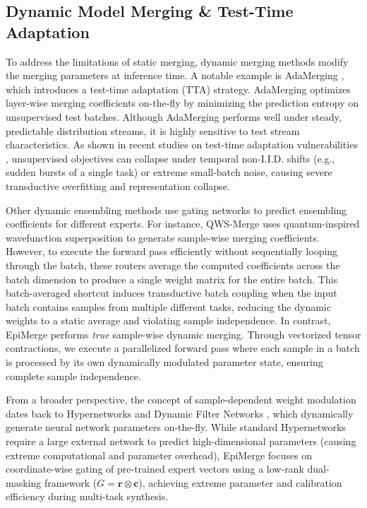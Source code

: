 \subsection{Dynamic Model Merging \& Test-Time Adaptation}
To address the limitations of static merging, dynamic merging methods modify the merging parameters at inference time. A notable example is AdaMerging \cite{adamerging}, which introduces a test-time adaptation (TTA) strategy. AdaMerging optimizes layer-wise merging coefficients on-the-fly by minimizing the prediction entropy on unsupervised test batches. Although AdaMerging performs well under steady, predictable distribution streams, it is highly sensitive to test stream characteristics. As shown in recent studies on test-time adaptation vulnerabilities \cite{wang2020tent, tta_rugged, tta_shift}, unsupervised objectives can collapse under temporal non-I.I.D. shifts (e.g., sudden bursts of a single task) or extreme small-batch noise, causing severe transductive overfitting and representation collapse.

Other dynamic ensembling methods use gating networks to predict ensembling coefficients for different experts. For instance, QWS-Merge \cite{qws_merge} uses quantum-inspired wavefunction superposition to generate sample-wise merging coefficients. However, to execute the forward pass efficiently without sequentially looping through the batch, these routers average the computed coefficients across the batch dimension to produce a single weight matrix for the entire batch. This batch-averaged shortcut induces transductive batch coupling when the input batch contains samples from multiple different tasks, reducing the dynamic weights to a static average and violating sample independence. In contrast, EpiMerge performs \emph{true} sample-wise dynamic merging. Through vectorized tensor contractions, we execute a parallelized forward pass where each sample in a batch is processed by its own dynamically modulated parameter state, ensuring complete sample independence.

From a broader perspective, the concept of sample-dependent weight modulation dates back to Hypernetworks \cite{ha2016hypernetworks} and Dynamic Filter Networks \cite{jia2016dynamic}, which dynamically generate neural network parameters on-the-fly. While standard Hypernetworks require a large external network to predict high-dimensional parameters (causing extreme computational and parameter overhead), EpiMerge focuses on coordinate-wise gating of pre-trained expert vectors using a low-rank dual-masking framework ($G = \mathbf{r} \otimes \mathbf{c}$), achieving extreme parameter and calibration efficiency during multi-task synthesis.

